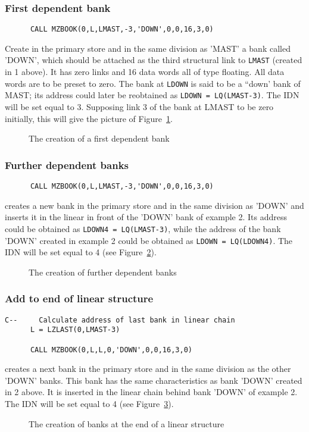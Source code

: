 \subsubsection{First dependent bank}
\begin{verbatim}
      CALL MZBOOK(0,L,LMAST,-3,'DOWN',0,0,16,3,0)
\end{verbatim}
\par Create in the primary store and in the same division as 'MAST'
a bank called 'DOWN', which should be attached as the third
structural link to {\tt LMAST} (created in 1 above). It has zero links
and 16 data words all of type floating.
All data words are to be preset to zero.
The bank at {\tt LDOWN} is said to be a ``down' bank of MAST; 
its address could
later be reobtained as {\tt LDOWN = LQ(LMAST-3)}.
The IDN will be set equal to 3. Supposing link 3 of the bank at
LMAST to be zero initially, this will give the picture of
Figure~\ref{MZBOOK2}.
\begin{figure}
\caption{The creation of a first dependent bank}
\label{MZBOOK2}
\end{figure}
\subsubsection{Further dependent banks}
\begin{verbatim}
      CALL MZBOOK(0,L,LMAST,-3,'DOWN',0,0,16,3,0)
\end{verbatim}
creates a new bank in the primary store and in the same division
as 'DOWN' and inserts it in the linear in front of the 'DOWN' bank
of example 2.
Its address could be obtained as {\tt LDOWN4 = LQ(LMAST-3)},
while the address of the
bank 'DOWN' created in example 2 could be obtained as {\tt LDOWN = LQ(LDOWN4)}.
The IDN will be set equal to 4 (see Figure~\ref{MZBOOK3}).
\begin{figure}
\label{MZBOOK3}
\caption{The creation of further dependent banks}
\end{figure}
\subsubsection{Add to end of linear structure}
\begin{verbatim}
C--     Calculate address of last bank in linear chain
      L = LZLAST(0,LMAST-3)
 
      CALL MZBOOK(0,L,L,0,'DOWN',0,0,16,3,0)
\end{verbatim}
creates a next bank in the primary store and in the same division
as the other 'DOWN' banks.
This bank has the same characteristics as bank
'DOWN' created in 2 above. It is inserted in the linear chain
behind bank 'DOWN' of example 2.
The IDN will be set equal to 4 (see Figure~\ref{MZBOOK4}).
\begin{figure}
\caption{The creation of banks at the end of a linear structure}
\label{MZBOOK4}
\end{figure}
